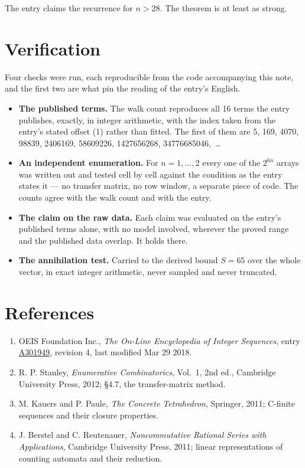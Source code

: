 \documentclass[11pt]{article}
\theoremstyle{definition}
\begin{document}
The entry claims the recurrence for $n > 28$. The theorem is at least as strong.

\section{Verification}

Four checks were run, each reproducible from the code accompanying this note, and the first two are what pin the reading of the entry's English.

\begin{itemize}

\item {\bfseries The published terms.} The walk count reproduces all 16 terms the entry publishes, exactly, in integer arithmetic, with the index taken from the entry's stated offset (1) rather than fitted. The first of them are 5, 169, 4070, 98839, 2406169, 58609226, 1427656268, 34776685046,~\dots

\item {\bfseries An independent enumeration.} For $n = 1,\dots,2$ every one of the $2^{6n}$ arrays was written out and tested cell by cell against the condition as the entry states it --- no transfer matrix, no row window, a separate piece of code. The counts agree with the walk count and with the entry.

\item {\bfseries The claim on the raw data.} Each claim was evaluated on the entry's published terms alone, with no model involved, wherever the proved range and the published data overlap. It holds there.

\item {\bfseries The annihilation test.} Carried to the derived bound $S = 65$ over the whole vector, in exact integer arithmetic, never sampled and never truncated.

\end{itemize}

\section{References}

\begin{enumerate}

\item OEIS Foundation Inc., \emph{The On-Line Encyclopedia of Integer Sequences}, entry \href{https://oeis.org/A301949}{A301949}, revision 4, last modified Mar 29 2018.

\item R. P. Stanley, \emph{Enumerative Combinatorics}, Vol.~1, 2nd ed., Cambridge University Press, 2012; \S4.7, the transfer-matrix method.

\item M. Kauers and P. Paule, \emph{The Concrete Tetrahedron}, Springer, 2011; C-finite sequences and their closure properties.

\item J. Berstel and C. Reutenauer, \emph{Noncommutative Rational Series with Applications}, Cambridge University Press, 2011; linear representations of counting automata and their reduction.

\end{enumerate}
\end{document}

